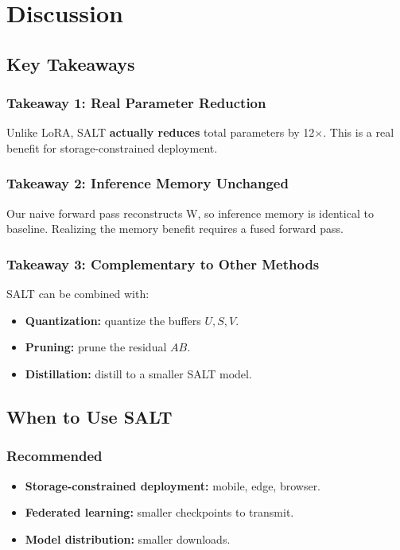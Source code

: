 
\section{Discussion}

\subsection{Key Takeaways}

\subsubsection{Takeaway 1: Real Parameter Reduction}

Unlike LoRA, SALT \textbf{actually reduces} total parameters by 12$\times$. This is a 
real benefit for storage-constrained deployment.

\subsubsection{Takeaway 2: Inference Memory Unchanged}

Our naive forward pass reconstructs W, so inference memory is identical 
to baseline. Realizing the memory benefit requires a fused forward pass.

\subsubsection{Takeaway 3: Complementary to Other Methods}

SALT can be combined with:
\begin{itemize}
\item \textbf{Quantization:} quantize the buffers $U, S, V$.
\item \textbf{Pruning:} prune the residual $AB$.
\item \textbf{Distillation:} distill to a smaller SALT model.

\end{itemize}
\subsection{When to Use SALT}

\subsubsection{Recommended}

\begin{itemize}
\item \textbf{Storage-constrained deployment:} mobile, edge, browser.
\item \textbf{Federated learning:} smaller checkpoints to transmit.
\item \textbf{Model distribution:} smaller downloads.

\end{itemize}
